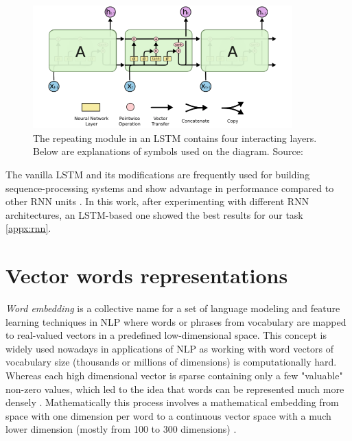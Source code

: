 \begin{figure}[h]
    \centering
    \includegraphics[width=10cm]{Images/lstm.png}
    \caption{The repeating module in an LSTM contains four interacting layers. Below are explanations of symbols used on the diagram. Source: \citep{Olah-2015}}
    \label{fig:lstm}
\end{figure} 

The vanilla LSTM and its modifications are frequently used for building sequence-processing systems and show advantage in performance compared to other RNN units \citep{Hochreiter-1997}.
In this work, after experimenting with different RNN architectures, an LSTM-based one showed the best results for our task \ref{appx:rnn}. 

\section{Vector words representations}

\textit{Word embedding} is a collective name for a set of language modeling and feature learning techniques in NLP where words or phrases from vocabulary are mapped to real-valued vectors in a predefined low-dimensional space. This concept is widely used nowadays in applications of NLP as working with word vectors of vocabulary size (thousands or millions of dimensions) is computationally hard. Whereas each high dimensional vector is sparse containing only a few "valuable" non-zero values, which led to the idea that words can be represented much more densely \citep{Harris-1954}. Mathematically this process involves a mathematical embedding from space with one dimension per word to a continuous vector space with a much lower dimension (mostly from 100 to 300 dimensions) \citep{Brownlee-2017}.

